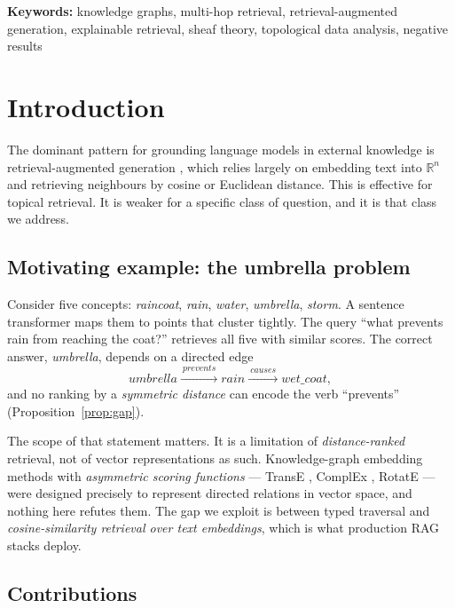 \documentclass[11pt]{article}
\theoremstyle{definition}
\begin{document}
\noindent\textbf{Keywords:} knowledge graphs, multi-hop retrieval, retrieval-augmented
generation, explainable retrieval, sheaf theory, topological data analysis, negative
results

\section{Introduction}

The dominant pattern for grounding language models in external knowledge is
retrieval-augmented generation \cite{lewis2020retrieval}, which relies largely on
embedding text into $\mathbb{R}^n$ and retrieving neighbours by cosine or Euclidean
distance. This is effective for topical retrieval. It is weaker for a specific class of
question, and it is that class we address.

\subsection{Motivating example: the umbrella problem}

Consider five concepts: \emph{raincoat}, \emph{rain}, \emph{water}, \emph{umbrella},
\emph{storm}. A sentence transformer maps them to points that cluster tightly. The
query ``what prevents rain from reaching the coat?'' retrieves all five with similar
scores. The correct answer, \emph{umbrella}, depends on a directed edge
\[
  \textit{umbrella} \xrightarrow{\ \textit{prevents}\ } \textit{rain}
  \xrightarrow{\ \textit{causes}\ } \textit{wet\_coat},
\]
and no ranking by a \emph{symmetric distance} can encode the verb ``prevents''
(Proposition~\ref{prop:gap}).

The scope of that statement matters. It is a limitation of \emph{distance-ranked}
retrieval, not of vector representations as such. Knowledge-graph embedding methods
with \emph{asymmetric scoring functions} --- TransE \cite{bordes2013translating},
ComplEx \cite{trouillon2016complex}, RotatE \cite{sun2019rotate} --- were designed
precisely to represent directed relations in vector space, and nothing here refutes
them. The gap we exploit is between typed traversal and \emph{cosine-similarity
retrieval over text embeddings}, which is what production RAG stacks deploy.

\subsection{Contributions}
\end{document}
